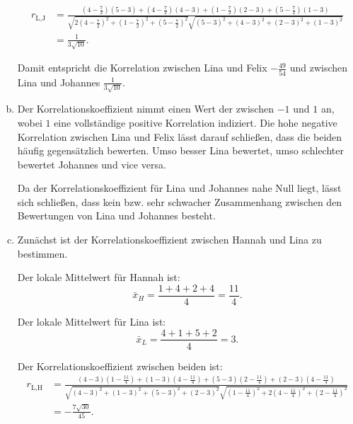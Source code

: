 \documentclass{article}
\begin{document}
\begin{enumerate}[a.]
\begin{equation*}
\begin{split}
r_{\text {L}, \text {J}}&=\frac{\left(4-\frac{7}{2}\right)\left(5-3\right)+\left(4-\frac{7}{2}\right)\left(4-3\right)+\left(1-\frac{7}{2}\right)\left(2-3\right)+\left(5-\frac{7}{2}\right)\left(1-3\right)}{\sqrt{2\left(4-\frac{7}{2}\right)^{2}+\left(1-\frac{7}{2}\right)^{2}+\left(5-\frac{7}{2}\right)^{2}} \sqrt{\left(5-3\right)^{2}+\left(4-3\right)^{2}+\left(2-3\right)^{2}+\left(1-3\right)^{2}}}\\
&= \frac{1}{3 \sqrt{10}}.
\end{split}
\end{equation*}

Damit entspricht die Korrelation zwischen Lina und Felix $-\frac{49}{54}$ und zwischen Lina und Johannes $\frac{1}{3 \sqrt{10}}$.

\item Der Korrelationskoeffizient nimmt einen Wert der zwischen $-1$ und $1$ an, wobei $1$ eine vollständige positive Korrelation indiziert. Die hohe negative Korrelation zwischen Lina und Felix lässt darauf schließen, dass die beiden häufig gegensätzlich bewerten. Umso besser Lina bewertet, umso schlechter bewertet Johannes und vice versa.

Da der Korrelationskoeffizient für Lina und Johannes nahe Null liegt, lässt sich schließen, dass kein bzw. sehr schwacher Zusammenhang zwischen den Bewertungen von Lina und Johannes besteht.
\item 
Zunächst ist der Korrelationskoeffizient zwischen Hannah und Lina zu bestimmen.

Der lokale Mittelwert für Hannah ist:
$$\bar{x}_{H}=\frac{1+4+2+4}{4}=\frac{11}{4}.
$$ 

Der lokale Mittelwert für Lina ist:
$$\bar{x}_{L}=\frac{4+1+5+2}{4}=3.
$$ 

Der Korrelationskoeffizient zwischen beiden ist:
\begin{equation*}
    \begin{split}
    r_{\text {L}, \text {H}}&=\frac{\left(4-3\right)\left(1-\frac{11}{4}\right)+\left(1-3\right)\left(4-\frac{11}{4}\right)+\left(5-3\right)\left(2-\frac{11}{4}\right)+\left(2-3\right)\left(4-\frac{11}{4}\right)}{\sqrt{\left(4-3\right)^{2}+\left(1-3\right)^{2}+\left(5-3\right)^{2}+\left(2-3\right)^{2}} \sqrt{\left(1-\frac{11}{4}\right)^{2}+2\left(4-\frac{11}{4}\right)^{2}+\left(2-\frac{11}{4}\right)^{2}}}\\
    &= -\frac{7\sqrt{30}}{45}.
    \end{split}
    \end{equation*}


\end{enumerate}
\end{document}
